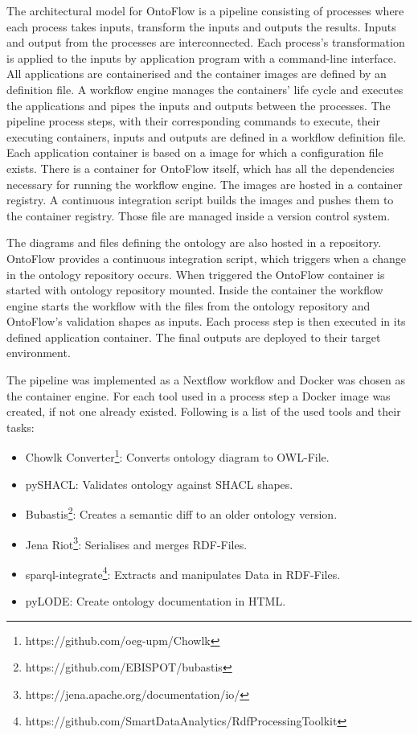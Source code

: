 \documentclass[sigconf]{acmart}
\begin{document}
The architectural model for OntoFlow is a pipeline consisting of processes where each process takes inputs, transform the inputs and outputs the results.
Inputs and output from the processes are interconnected.
Each process's transformation is applied to the inputs by application program with a command-line interface.
All applications are containerised and the container images are defined by an definition file.
A workflow engine manages the containers' life cycle and executes the applications and pipes the inputs and outputs between the processes.
The pipeline process steps, with their corresponding commands to execute, their executing containers, inputs and outputs are defined in a workflow definition file.
Each application container is based on a image for which a configuration file exists.
There is a container for OntoFlow itself, which has all the dependencies necessary for running the workflow engine.
The images are hosted in a container registry.
A continuous integration script builds the images and pushes them to the container registry.
Those file are managed inside a version control system.

The diagrams and files defining the ontology are also hosted in a repository.
OntoFlow provides a continuous integration script, which triggers when a change in the ontology repository occurs.
When triggered the OntoFlow container is started with ontology repository mounted.
Inside the container the workflow engine starts the workflow with the files from the ontology repository and OntoFlow's validation shapes as inputs.
Each process step is then executed in its defined application container.
The final outputs are deployed to their target environment.


The pipeline was implemented as a Nextflow workflow and Docker was chosen as the container engine.
For each tool used in a process step a Docker image was created, if not one already existed.
Following is a list of the used tools and their tasks:

\begin{itemize}
  \item Chowlk Converter\footnote{https://github.com/oeg-upm/Chowlk}: Converts ontology diagram to OWL-File.
  \item pySHACL: Validates ontology against SHACL shapes.
  \item Bubastis\footnote{https://github.com/EBISPOT/bubastis}: Creates a semantic diff to an older ontology version.
  \item Jena Riot\footnote{https://jena.apache.org/documentation/io/}: Serialises and merges RDF-Files.
  \item sparql-integrate\footnote{https://github.com/SmartDataAnalytics/RdfProcessingToolkit}: Extracts and manipulates Data in RDF-Files.
  \item pyLODE: Create ontology documentation in HTML.
\end{itemize}
\end{document}
